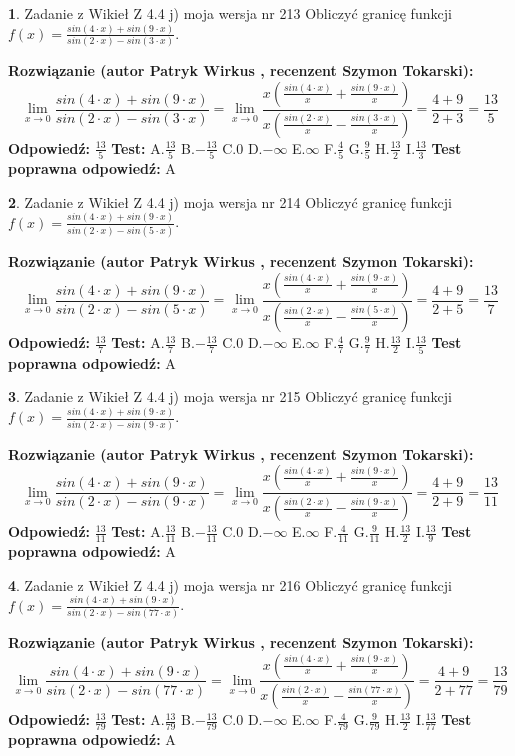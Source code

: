 \documentclass[12pt, a4paper]{article}
\theoremstyle{definition} %
\newtheorem{zad}{}
\newcommand{\zadStart}[1]{\begin{zad}#1\newline}
\newcommand{\zadStop}{\end{zad}}
\newcommand{\rozwStart}[2]{\noindent \textbf{Rozwiązanie (autor #1 , recenzent #2): }\newline}
\newcommand{\rozwStop}{\newline}
\newcommand{\odpStart}{\noindent \textbf{Odpowiedź:}\newline}
\newcommand{\odpStop}{\newline}
\newcommand{\testStart}{\noindent \textbf{Test:}\newline}
\newcommand{\testStop}{\newline}
\newcommand{\kluczStart}{\noindent \textbf{Test poprawna odpowiedź:}\newline}
\newcommand{\kluczStop}{\newline}
\begin{document}
\zadStart{Zadanie z Wikieł Z 4.4 j) moja wersja nr 213}
Obliczyć granicę funkcji $f(x)=\frac{sin(4\cdot x) +sin(9\cdot x)}{sin(2\cdot x) -sin(3\cdot x)}$.
\zadStop
\rozwStart{Patryk Wirkus}{Szymon Tokarski}
$$\lim\limits_{x\to 0}\frac{sin(4\cdot x) +sin(9\cdot x)}{sin(2\cdot x) -sin(3\cdot x)}=\lim\limits_{x\to 0}\frac{x(\frac{sin(4\cdot x)}{x}+\frac{sin(9\cdot x)}{x})}{x(\frac{sin(2\cdot x)}{x}-\frac{sin(3\cdot x)}{x})}=\frac{4+9}{2+3} = \frac{13}{5}$$
\rozwStop
\odpStart
$\frac{13}{5}$
\odpStop
\testStart
A.$\frac{13}{5}$
B.$-\frac{13}{5}$
C.$0$
D.$-\infty$
E.$\infty$
F.$\frac{4}{5}$
G.$\frac{9}{5}$
H.$\frac{13}{2}$
I.$\frac{13}{3}$
\testStop
\kluczStart
A
\kluczStop



\zadStart{Zadanie z Wikieł Z 4.4 j) moja wersja nr 214}
Obliczyć granicę funkcji $f(x)=\frac{sin(4\cdot x) +sin(9\cdot x)}{sin(2\cdot x) -sin(5\cdot x)}$.
\zadStop
\rozwStart{Patryk Wirkus}{Szymon Tokarski}
$$\lim\limits_{x\to 0}\frac{sin(4\cdot x) +sin(9\cdot x)}{sin(2\cdot x) -sin(5\cdot x)}=\lim\limits_{x\to 0}\frac{x(\frac{sin(4\cdot x)}{x}+\frac{sin(9\cdot x)}{x})}{x(\frac{sin(2\cdot x)}{x}-\frac{sin(5\cdot x)}{x})}=\frac{4+9}{2+5} = \frac{13}{7}$$
\rozwStop
\odpStart
$\frac{13}{7}$
\odpStop
\testStart
A.$\frac{13}{7}$
B.$-\frac{13}{7}$
C.$0$
D.$-\infty$
E.$\infty$
F.$\frac{4}{7}$
G.$\frac{9}{7}$
H.$\frac{13}{2}$
I.$\frac{13}{5}$
\testStop
\kluczStart
A
\kluczStop



\zadStart{Zadanie z Wikieł Z 4.4 j) moja wersja nr 215}
Obliczyć granicę funkcji $f(x)=\frac{sin(4\cdot x) +sin(9\cdot x)}{sin(2\cdot x) -sin(9\cdot x)}$.
\zadStop
\rozwStart{Patryk Wirkus}{Szymon Tokarski}
$$\lim\limits_{x\to 0}\frac{sin(4\cdot x) +sin(9\cdot x)}{sin(2\cdot x) -sin(9\cdot x)}=\lim\limits_{x\to 0}\frac{x(\frac{sin(4\cdot x)}{x}+\frac{sin(9\cdot x)}{x})}{x(\frac{sin(2\cdot x)}{x}-\frac{sin(9\cdot x)}{x})}=\frac{4+9}{2+9} = \frac{13}{11}$$
\rozwStop
\odpStart
$\frac{13}{11}$
\odpStop
\testStart
A.$\frac{13}{11}$
B.$-\frac{13}{11}$
C.$0$
D.$-\infty$
E.$\infty$
F.$\frac{4}{11}$
G.$\frac{9}{11}$
H.$\frac{13}{2}$
I.$\frac{13}{9}$
\testStop
\kluczStart
A
\kluczStop



\zadStart{Zadanie z Wikieł Z 4.4 j) moja wersja nr 216}
Obliczyć granicę funkcji $f(x)=\frac{sin(4\cdot x) +sin(9\cdot x)}{sin(2\cdot x) -sin(77\cdot x)}$.
\zadStop
\rozwStart{Patryk Wirkus}{Szymon Tokarski}
$$\lim\limits_{x\to 0}\frac{sin(4\cdot x) +sin(9\cdot x)}{sin(2\cdot x) -sin(77\cdot x)}=\lim\limits_{x\to 0}\frac{x(\frac{sin(4\cdot x)}{x}+\frac{sin(9\cdot x)}{x})}{x(\frac{sin(2\cdot x)}{x}-\frac{sin(77\cdot x)}{x})}=\frac{4+9}{2+77} = \frac{13}{79}$$
\rozwStop
\odpStart
$\frac{13}{79}$
\odpStop
\testStart
A.$\frac{13}{79}$
B.$-\frac{13}{79}$
C.$0$
D.$-\infty$
E.$\infty$
F.$\frac{4}{79}$
G.$\frac{9}{79}$
H.$\frac{13}{2}$
I.$\frac{13}{77}$
\testStop
\kluczStart
A
\kluczStop
\end{document}
